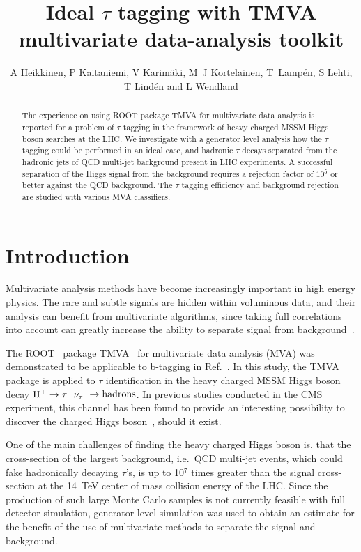 \documentclass[a4paper]{jpconf}
\newcommand{\Hplustaunu}{\mbox{${\rm H}^{\pm} \to \tau^{\pm}\nu_{\tau}$}}
\begin{document}
\title{Ideal $\tau$ tagging with TMVA multivariate data-analysis toolkit}

\author{A Heikkinen, P Kaitaniemi, V Karim\"{a}ki,
M~J Kortelainen, T~Lamp\'{e}n, S Lehti, T Lind\'{e}n and L Wendland} 

\address{Helsinki Institute of Physics, P.O. Box 64, FIN-00014 University of Helsinki, Finland}



\begin{abstract}
The experience on using ROOT package TMVA for
multivariate data analysis is reported for a problem of $\tau$ tagging in the
framework of heavy charged MSSM Higgs boson searches at the LHC.
We investigate with a generator level analysis 
how the $\tau$ tagging could be performed in an ideal case, 
and hadronic $\tau$ decays separated from the 
hadronic jets of QCD multi-jet background present in LHC experiments.
A successful separation of the Higgs signal from the background
requires a rejection factor of $10^5$ or better against the QCD background.
The $\tau$ tagging efficiency and background rejection are studied with various MVA classifiers.
\end{abstract}


\section{Introduction}
Multivariate analysis methods have become increasingly important in high energy physics.
The rare and subtle signals are hidden within voluminous data, 
and their analysis can benefit from multivariate algorithms, 
since taking full correlations into account can greatly increase the ability to separate signal
from background~\cite{statlearn}.

The ROOT~\cite{root} package TMVA~\cite{tmvaguide} for multivariate data analysis (MVA) 
was demonstrated to be applicable to b-tagging in Ref.~\cite{chep07tmva}.
In this study, the TMVA package is applied to $\tau$ identification in the heavy charged MSSM Higgs
boson decay \Hplustaunu~$\to {\rm hadrons}$. In previous studies
conducted in the CMS experiment, this channel has been found to
provide an interesting possibility to discover the charged Higgs
boson~\cite{ptdrII}, should it exist.

One of the main challenges of finding the heavy charged Higgs boson is, 
that the cross-section of the largest background, 
i.e.~QCD multi-jet events, 
which could fake hadronically decaying $\tau$'s, 
is up to 10$^7$ times greater than the signal cross-section at the 14~TeV center of mass
collision energy of the LHC. 
Since the production of such large Monte Carlo samples is not
currently feasible with full detector simulation, generator level
simulation was used to obtain an estimate for the
benefit of the use of multivariate methods to separate the signal and
background.
\end{document}

